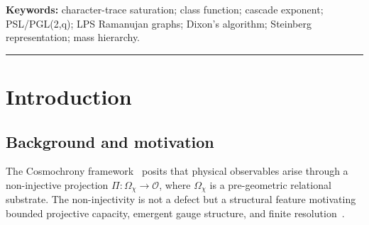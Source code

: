 \documentclass[11pt,a4paper]{article}
\theoremstyle{plain}
\theoremstyle{definition}
\theoremstyle{remark}
\newcommand{\F}{\mathbb{F}}
\newcommand{\betaeff}{\beta_{\mathrm{eff}}}
\newcommand{\betastar}{\beta^*}
\begin{document}
\begin{abstract}
    A shell-layered transitional novelty, testing shell $n$ only against strictly earlier shells
    (avoiding both self-reference and traversal-order dependence), shows that character-trace
    transition fingerprints collapse to a fixed, low-dimensional span, fixed-matrix proxies saturate
    their own ambient dimension within a handful of shells, and a Steinberg-based fingerprint on
    $\mathbb{P}^1(\F_q)$ saturates its full ambient space within the first two to three
    graph-distance shells for every tested $q\in\{13,17,29\}$, leaving no pre-saturation window from
    which to extract an exponent.
    None of these constructions yields a viable mechanism for $\betastar$.
    A matrix-level redundancy law of the form $\betaeff=1/(1/2+\alpha)$ is not supported by the
    constructions examined here: no construction here supplies a regime in which $\alpha$ could even
    be measured, and its functional form coincides with a conversion law the companion Span-Growth
    Note proves does not transfer natively to a different admissibility substrate.
    O5's contribution is an obstruction result: finite character-trace encodings of the vertex
    boundary cannot supply the rich, mode-resolved novelty a viable mechanism would need; the genuine
    eigenvalue-level frontier remains unconstructed, left open for a future paper.
  \end{abstract}

  \textbf{Keywords:} character-trace saturation; class function; cascade exponent; PSL/PGL(2,q);
  LPS Ramanujan graphs; Dixon's algorithm; Steinberg representation; mass hierarchy.

  \clearpage
  \tableofcontents
  \bigskip\hrule\bigskip

  \clearpage

  \section{Introduction}
    \label{sec:introduction}

    \subsection{Background and motivation}

      The Cosmochrony framework~\cite{Cosmochrony} posits that physical observables arise through
      a non-injective projection $\Pi\colon \Omega_\chi \to \mathcal{O}$, where $\Omega_\chi$ is a
      pre-geometric relational substrate.
      The non-injectivity is not a defect but a structural feature motivating bounded projective
      capacity, emergent gauge structure, and finite resolution~\cite{Beau2026c}.
\end{document}
